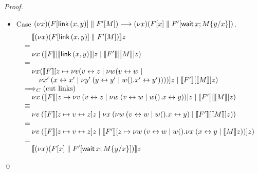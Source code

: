 \documentclass[orivec,envcountsame]{llncs}
\begin{document}
\begin{proof}
\begin{itemize}
\item Case $(\nu x) (F[\mathsf{link} \, (x, y)] \parallel F'[M]) \longrightarrow
          (\nu x)(F[x] \parallel F'[\mathsf{wait} \, x; M\{y/x\}])$.
\[
\bl
\quad \tocp{(\nu x) (\Fx[\gvconst{link} \app (x, y)] \parallel \Fx'[M])}z \\
= \\
\quad \cut{x}{}
         {\tocp{\Fx}[\tocp{\gvconst{link} \app (x, y)}]z}
         {\tocp{\Fx'}[\tocp{M}]z} \\
= \\
\quad \nu x
         (\tocp{\Fx}[z \mapsto 
                       \nu v (\link v z \mid
                         \nu w (\link v w \mid \\
\qquad 
                           {\cut{x'}{}
                             {\link{x}{x'}}
                             {\cut{y'}{}{\link{y}{y'}}{w().\link{x'}{y'}}}}))]z \mid
         {\tocp{\Fx'}[\tocp{M}]z}) \\
\bigcrto (\text{cut links}) \\
\quad \cut{x}{}
         {\tocp{\Fx}[z \mapsto 
                       \cut{v}{}{\link v z}
                         {\cut{w}{}{\link v w}
                            {w().\link{x}{y}}}]z}
         {\tocp{\Fx'}[\tocp{M}]z} \\
\equiv \\
\quad \cut{v}{}
         {\tocp{\Fx}[z \mapsto \link v z]z}
         {\cut{x}{}
           {\cut{w}{}
              {\link v w}
              {w().\link{x}{y}}}
           {\tocp{\Fx'}[\tocp{M}]z}} \\
\equiv \\
\quad 
  \cut{v}{}
    {\tocp{\Fx}[z \mapsto \link v z]z}
    {\tocp{\Fx'}[z \mapsto
                  \cut{w}{}
                     {\link v w}
                     {w().\cut{x}{}{\link x y}{\tocp{M}z}}]z} \\
= \\
\quad \tocp{(\nu x)(\Fx[x] \parallel \Fx'[\gvletunit{\gvconst{wait} \app x}{M\{y/x\}}])}z
\el
\]

\end{itemize}
\qed
\end{proof}
\end{document}
